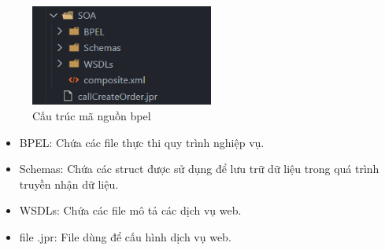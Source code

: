 \begin{figure}[!htp]
    \begin{center}
        \includegraphics[width=6cm]{img/file-structure/bpel.png}
    \end{center}
    \caption{Cấu trúc mã nguồn bpel}
\end{figure}

\begin{itemize}
    \item BPEL: Chứa các file thực thi quy trình nghiệp vụ.
    \item Schemas: Chứa các struct được sử dụng để lưu trữ dữ liệu trong quá trình truyền nhận dữ liệu.
    \item WSDLs: Chứa các file mô tả các dịch vụ web.
    \item file .jpr: File dùng để cấu hình dịch vụ web.
\end{itemize}